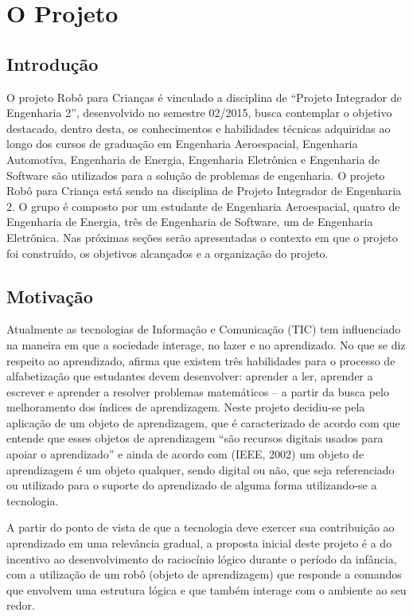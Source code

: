 \chapter[O Projeto]{O Projeto}

\section{Introdução}
O projeto Robô para Crianças é vinculado a disciplina de “Projeto Integrador de Engenharia 2”, desenvolvido
no semestre 02/2015, busca contemplar o objetivo destacado, dentro desta, os conhecimentos e habilidades
técnicas adquiridas ao longo dos cursos de graduação em Engenharia Aeroespacial,  Engenharia Automotíva,
Engenharia de Energia, Engenharia Eletrônica e Engenharia de Software são utilizados para a solução de
problemas de engenharia. O projeto Robô para Criança está sendo  na disciplina de Projeto Integrador de
Engenharia 2. O grupo é composto por um estudante de Engenharia Aeroespacial, quatro de
Engenharia de Energia, três de Engenharia de Software, um de Engenharia Eletrônica. Nas próximas seções serão
apresentadas o contexto em que o projeto foi construído, os objetivos alcançados e a organização do projeto.


\section{Motivação}
Atualmente as tecnologias de Informação e Comunicação (TIC) tem influenciado na maneira em que a sociedade
interage, no lazer e no aprendizado. No que se diz respeito ao aprendizado,  afirma que
existem três habilidades para o processo de alfabetização que estudantes devem desenvolver: aprender a ler, aprender
a escrever e aprender a resolver problemas matemáticos – a partir da busca pelo melhoramento dos índices de
aprendizagem. Neste projeto decidiu-se pela aplicação de um objeto de aprendizagem, que é caracterizado de
acordo com  que entende que esses objetos de aprendizagem “são recursos digitais usados para
apoiar o aprendizado” e ainda de acordo com (IEEE, 2002) um objeto de aprendizagem é um objeto qualquer, sendo
digital ou não, que seja referenciado ou utilizado para o suporte do aprendizado de alguma forma utilizando-se
a tecnologia.

A partir do ponto de vista de que a tecnologia deve exercer sua contribuição ao aprendizado em uma relevância
gradual, a proposta inicial deste projeto é a do incentivo ao desenvolvimento do raciocínio lógico durante o período
da infância, com a utilização de um robô (objeto de aprendizagem) que responde a comandos que envolvem uma
estrutura lógica e que também interage com o ambiente ao seu redor.

